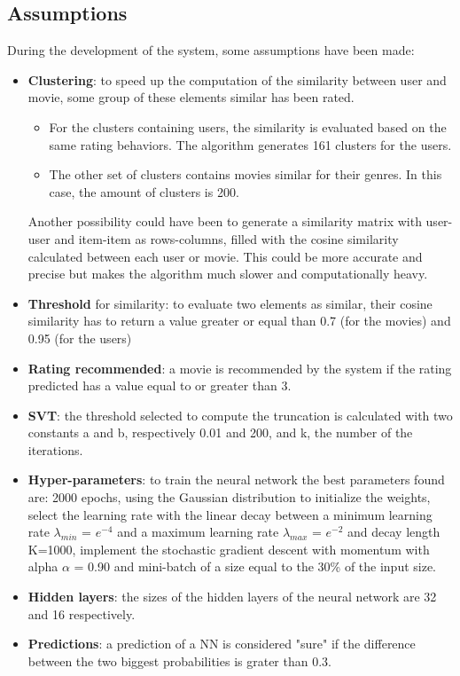 \documentclass{article}
\begin{document}
\subsection{Assumptions}
During the development of the system, some assumptions have been made:
\begin{itemize}
      \item \textbf{Clustering}: to speed up the computation of the similarity between user and movie, some group of these elements similar has been rated.
      \begin{itemize}
            \item For the clusters containing users, the similarity is evaluated based on the same rating behaviors. The algorithm generates 161 clusters for the users. 
            \item The other set of clusters contains movies similar for their genres. In this case, the amount of clusters is 200.
      \end{itemize} 
      Another possibility could have been to generate a similarity matrix with user-user and item-item as rows-columns, filled with the cosine similarity calculated between each user or movie. This could be more accurate and precise but makes the algorithm much slower and computationally heavy.
      \item \textbf{Threshold} for similarity: to evaluate two elements as similar, their cosine similarity has to return a value greater or equal than 0.7 (for the movies) and 0.95 (for the users)
      \item \textbf{Rating recommended}: a movie is recommended by the system if the rating predicted has a value equal to or greater than 3.
      \item \textbf{SVT}: the threshold selected to compute the truncation is calculated with two constants a and b, respectively 0.01 and 200, and k, the number of the iterations.
      \item \textbf{Hyper-parameters}: to train the neural network the best parameters found are:
      2000 epochs, using the Gaussian distribution to initialize the weights, select the learning rate with the linear decay between a minimum learning rate ${\lambda_{min}}$ = ${e^{-4}}$ and a maximum learning rate ${\lambda_{max}}$ = ${e^{-2}}$ and decay length K=1000, implement the stochastic gradient descent with momentum with alpha ${\alpha}$ = 0.90 and mini-batch of a size equal to the 30\% of the input size. 
      \item \textbf{Hidden layers}: the sizes of the hidden layers of the neural network are 32 and 16 respectively.
      \item \textbf{Predictions}: a prediction of a NN is considered "sure" if the difference between the two biggest probabilities is grater than 0.3.
\end{itemize}
\end{document}
